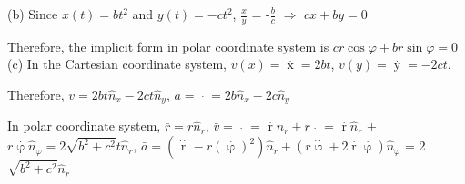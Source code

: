 \documentclass[12pt,a4paper]{article}
\begin{document}
\noindent (b) Since $x(t) = bt^2$ and $y(t) = -ct^2$, $\frac{x}{y}$ = -$\frac{b}{c}$ $\Rightarrow$ $cx+by = 0$
\par Therefore, the implicit form in polar coordinate system is $cr\cos\varphi + br\sin\varphi = 0$\\
\noindent (c) In the Cartesian coordinate system, $v(x) = \mathop{x(t)}\limits^{\cdot} = 2bt$, $v(y) = \mathop{y(t)}\limits^{\cdot} = -2ct$. 
\par Therefore, $\bar{v} = 2bt\hat{n}_x - 2ct\hat{n}_y$, $\bar{a} = \mathop{\bar{v}}\limits^\cdot = 2b\hat{n}_x - 2c\hat{n}_y$
\par In polar coordinate system, $\bar{r} = r\hat{n}_r$, $\bar{v} = \mathop{\bar{r}}\limits^{\cdot}$ = $\mathop{r}\limits^{\cdot}\hat{n}_r + r\mathop{\hat{n}_r}\limits^{\cdot}$ = $\mathop{r}\limits^{\cdot}\hat{n}_r$ + $r\mathop{\varphi}\limits^{\cdot}\hat{n}_\varphi = 2\sqrt{b^2+c^2}t\hat{n}_r$, $\bar{a} = (\mathop{r}\limits^{\cdot\cdot} - r(\mathop{\varphi}\limits^{\cdot})^2)\hat{n}_r + (r\mathop{\varphi}\limits^{\cdot\cdot}+2\mathop{r}\limits^{\cdot}\mathop{\varphi}\limits^{\cdot})\hat{n}_\varphi$ = 2$\sqrt{b^2+c^2}\hat{n}_r$
\end{document}
